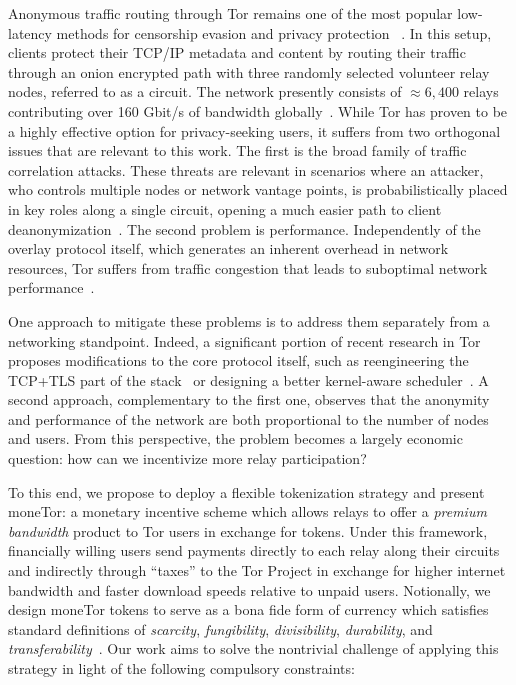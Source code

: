 Anonymous traffic routing through Tor remains one of the most popular low-latency methods for censorship evasion and privacy protection ~\cite{dingledine2004tor}.
In this setup, clients protect their TCP/IP metadata and content by routing their traffic through an onion encrypted path with three randomly selected volunteer relay nodes, referred to as a circuit.
The network presently consists of $\approx 6,400$ relays contributing over 160 Gbit/s of bandwidth globally~\cite{portal2018tormetrics}.
While Tor has proven to be a highly effective option for privacy-seeking users, it suffers from two orthogonal issues that are relevant to this work.
The first is the broad family of traffic correlation attacks.
These threats are relevant in scenarios where an attacker, who controls multiple nodes or network vantage points, is probabilistically placed in key roles along a single circuit, opening a much easier path to client deanonymization~\cite{wright2004predecessor,murdoch2005low}.
The second problem is performance.
Independently of the overlay protocol itself, which generates an inherent overhead in network resources, Tor suffers from traffic congestion that leads to suboptimal network performance~\cite{portal2018tormetrics, alsabah2016performance}.

One approach to mitigate these problems is to address them separately from a networking standpoint.
Indeed, a significant portion of recent research in Tor proposes modifications to the core protocol itself, such as reengineering the TCP+TLS part of the stack~\cite{reardon2009improving} or designing a better kernel-aware scheduler~\cite{jansen2014never}.
A second approach, complementary to the first one, observes that the anonymity and performance of the network are both proportional to the number of nodes and users.
From this perspective, the problem becomes a largely economic question: how can we incentivize more relay participation?

To this end, we propose to deploy a flexible tokenization strategy and present moneTor: a monetary incentive scheme which allows relays to offer a \emph{premium bandwidth} product to Tor users in exchange for tokens.
Under this framework, financially willing users send payments directly to each relay along their circuits and indirectly through ``taxes'' to the Tor Project in exchange for higher internet bandwidth and faster download speeds relative to unpaid users.
Notionally, we design moneTor tokens to serve as a bona fide form of currency which satisfies standard definitions of \textit{scarcity}, \textit{fungibility}, \textit{divisibility}, \textit{durability}, and \textit{transferability}~\cite[p.3]{crump2011phenomenon}.
Our work aims to solve the nontrivial challenge of applying this strategy in light of the following compulsory constraints:

